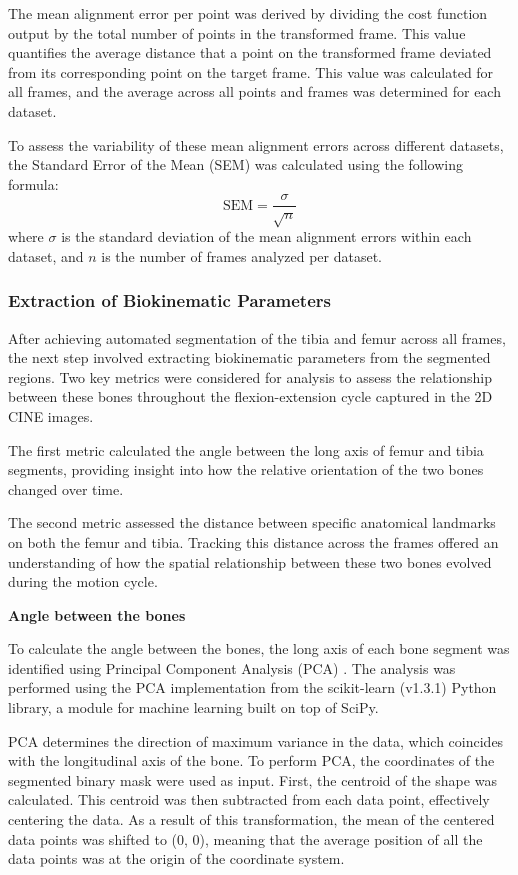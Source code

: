\documentclass{micro-econ-thesis}
\begin{document}
The mean alignment error per point was derived by dividing the cost function output by the total number of points in the transformed frame. This value quantifies the average distance that a point on the transformed frame deviated from its corresponding point on the target frame. This value was calculated for all frames, and the average across all points and frames was determined for each dataset.

To assess the variability of these mean alignment errors across different datasets, the Standard Error of the Mean (SEM) was calculated using the following formula:
\begin{equation}
	\text{SEM} = \frac{\sigma}{\sqrt{n}}
\end{equation}
where $\sigma$ is the standard deviation of the mean alignment errors within each dataset, and $n$ is the number of frames analyzed per dataset.

\subsubsection{Extraction of Biokinematic Parameters}
After achieving automated segmentation of the tibia and femur across all frames, the next step involved extracting biokinematic parameters from the segmented regions. Two key metrics were considered for analysis to assess the relationship between these bones throughout the flexion-extension cycle captured in the 2D CINE images.

The first metric calculated the angle between the long axis of femur and tibia segments, providing insight into how the relative orientation of the two bones changed over time.

The second metric assessed the distance between specific anatomical landmarks on both the femur and tibia. Tracking this distance across the frames offered an understanding of how the spatial relationship between these two bones evolved during the motion cycle. 

\textbf{Angle between the bones}

To calculate the angle between the bones, the long axis of each bone segment was identified using Principal Component Analysis (PCA) \parencite{jolliffe_principal_2004}. The analysis was performed using the PCA implementation from the scikit-learn (v1.3.1) Python library, a module for machine learning built on top of SciPy.

PCA determines the direction of maximum variance in the data, which coincides with the longitudinal axis of the bone. To perform PCA, the coordinates of the segmented binary mask were used as input. First, the centroid of the shape was calculated. This centroid was then subtracted from each data point, effectively centering the data. As a result of this transformation, the mean of the centered data points was shifted to (0, 0), meaning that the average position of all the data points was at the origin of the coordinate system. 
\end{document}
